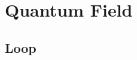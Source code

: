 \documentclass{tufte-book} %
\newcommand{\doccls}[1]{\texttt{#1}}
\newcommand{\VDQI}{\textit{The Visual Display of Quantitative Information}\xspace}
\newcommand{\EI}{\textit{Envisioning Information}\xspace}
\newcommand{\VE}{\textit{Visual Explanations}\xspace}
\newcommand{\BE}{\textit{Beautiful Evidence}\xspace}
\begin{document}


\mainmatter



\chapter{Quantum Field}
\label{ch:quantum_field}
\section{Loop}




\end{document}
